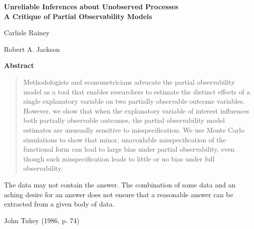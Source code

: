\documentclass[10pt]{article}
\begin{document}
\begin{center}
{\LARGE \textbf{Unreliable Inferences about Unobserved Processes}\\\vspace{2mm}
{\large \textbf{A Critique of Partial Observability Models}}}

\vspace{10mm}

Carlisle Rainey

\vspace{3mm}

Robert A. Jackson
\end{center}

\vspace{10mm}

{\centerline{\textbf{Abstract}}}
\begin{quote}\noindent
Methodologists and econometricians advocate the partial observability model as a tool that enables researchers to estimate the distinct effects of a single explanatory variable on two partially observable outcome variables. 
However, we show that when the explanatory variable of interest influences both partially observable outcomes, the partial observability model estimates are unusually sensitive to misspecification. 
We use Monte Carlo simulations to show that minor, unavoidable misspecification of the functional form can lead to large bias under partial observability, even though such misspecification leads to little or no bias under full observability.
 \end{quote}
\vspace{10mm}
\epigraph{The data may not contain the answer. The combination of some data and an 
aching desire for an answer does not ensure that a reasonable answer can be extracted from a given body of data.}{John Tukey (1986, p. 74)}
\end{document}
